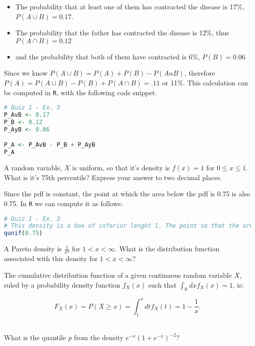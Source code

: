 \documentclass{homework}
\begin{document}
\begin{itemize}
    \item The probability that at least one of them has contracted the disease is 17\%, $P (A\cup B) = 0.17$.
    \item The probability that the father has contracted the disease is 12\%, thus $P (A\cap B) = 0.12$
    \item and the probability that both of them have contracted is 6\%, $P(B)=0.06$
\end{itemize}

Since we know $P(A\cup B)=P(A)+P(B)-P(AnB)$, therefore $P(A)=P(A\cup B)-P(B)+P(A\cap B)=.11$ or 11\%. This calculation can be computed in \texttt{R}, with the following code snippet. 

\begin{lstlisting}[language=R]
# Quiz 1 - Ex. 3
P_AvB <- 0.17
P_B <- 0.12
P_AyB <- 0.06

P_A <- P_AvB - P_B + P_AyB
P_A
\end{lstlisting}

\begin{tcolorbox}[title=Question 4]
A random variable, $X$ is uniform, so that it's density is $f(x) = 1$ for $0\leq x \leq 1$. What is it's 75th percentile? Express your answer to two decimal places.
\end{tcolorbox}

Since the pdf is constant, the point at which the area below the pdf is 0.75 is also 0.75. In \texttt{R} we can compute it as follows:

\begin{lstlisting}[language=R]
# Quiz 1 - Ex. 3
# This density is a box of inferior lenght 1. The point so that the area below it is  
qunif(0.75)
\end{lstlisting}

\begin{tcolorbox}[title=Question 5]
A Pareto density is $\frac{1}{x^2}$
for $1 < x < \infty$. What is the distribution function associated with this density for $1 < x < \infty$?
\end{tcolorbox}

The cumulative distribution function of a given continuous random variable $X$, ruled by a probability density function $f_X(x)$ such that $\int_{\mathds{R}}dx f_X(x) = 1$, is:

$$
F_{X}(x)= P(X\geq x) = \int_{1}^{x} dt f_X(t) = 1 - \frac{1}{x}.
$$\\

\begin{tcolorbox}[title=Question 6]
What is the quantile $p$ from the density $e^{-x}(1 + e^{-x})^{-2}$?
\end{tcolorbox}
\end{document}
